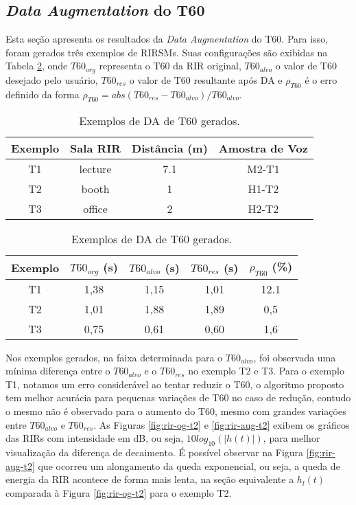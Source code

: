 \subsection{\textit{Data Augmentation} do T60}

Esta seção apresenta os resultados da \textit{Data Augmentation} do T60. Para isso, foram gerados três exemplos de RIRSMs. Suas configurações
são exibidas na Tabela \ref{tbl:da-t60}, onde $T60_{org}$ representa o T60 da RIR original, $T60_{alvo}$ o valor de T60 desejado pelo usuário,
$T60_{res}$ o valor de T60 resultante após DA e $\rho_{T60}$ é o erro definido da forma $\rho_{T60} = abs(T60_{res} - T60_{alvo})/T60_{alvo}$.

\begin{table} [H]
    \centering
    \caption{Exemplos de DA de T60 gerados.}
    \label{tbl:da-t60}
    \begin{tabular}{c|c|c|c}

        \textbf{Exemplo} & 
        \textbf{Sala RIR} & 
        \textbf{Distância (m)} &
        \textbf{Amostra de Voz} \\
        \hline 

        T1 & lecture & 7.1 & M2-T1 \\
        T2 & booth & 1 & H1-T2 \\
        T3 & office & 2 & H2-T2 \\

    \end{tabular}
    \bigbreak
    \bigbreak
    \begin{tabular}{c|c|c|c|c}

        \textbf{Exemplo} & 
        \textbf{$T60_{org}$ (s)} & 
        \textbf{$T60_{alvo}$ (s)} &
        \textbf{$T60_{res}$ (s)} & 
        \textbf{$\rho_{T60}$ (\%)} \\
        \hline 

        T1 & 1,38 & 1,15 & 1,01 & 12.1 \\
        T2 & 1,01 & 1,88 & 1,89 & 0,5 \\
        T3 & 0,75 & 0,61 & 0,60 & 1,6 \\

    \end{tabular}
\end{table}

Nos exemplos gerados, na faixa determinada para o $T60_{alvo}$, foi observada uma mínima diferença entre o $T60_{alvo}$ e o $T60_{res}$ no exemplo T2 e T3.
Para o exemplo T1, notamos um erro considerável ao tentar reduzir o T60, o algoritmo proposto tem melhor acurácia para pequenas variações de T60 no caso de
redução, contudo o mesmo não é observado para o aumento do T60, mesmo com grandes variações entre $T60_{alvo}$ e $T60_{res}$.
As Figuras \ref{fig:rir-og-t2} e \ref{fig:rir-aug-t2} exibem os gráficos das RIRs com intensidade em dB, ou seja, $10 log_{10}(|h(t)|)$, para melhor 
visualização da diferença de decaimento. 
É possível observar na Figura \ref{fig:rir-aug-t2} que ocorreu um alongamento da queda exponencial, ou seja, a queda de energia da RIR
acontece de forma mais lenta, na seção equivalente a $h_l(t)$ comparada à Figura \ref{fig:rir-og-t2} para o exemplo T2.

